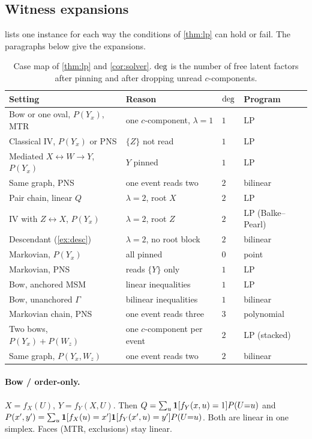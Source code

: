 \subsection{Witness expansions}
\label{app:witnesses}

 lists one instance for each way the conditions of
\cref{thm:lp} can hold or fail. The paragraphs below give the expansions.

\begin{table}[ht]
\centering
\caption{Case map of \cref{thm:lp} and \cref{cor:solver}. $\mathrm{deg}$ is the
number of free latent factors after pinning and after dropping unread
$c$-components.}
\label{tab:casemap}
\small
\begin{tabular}{@{}llll@{}}
\toprule
Setting & Reason & $\mathrm{deg}$ & Program \\
\midrule
Bow or one oval, $P(Y_x)$, MTR & one $c$-component, $\lambda=1$ & $1$ & LP \\
Classical IV, $P(Y_x)$ or PNS & $\{Z\}$ not read & $1$ & LP \\
Mediated $X\leftrightarrow W\to Y$, $P(Y_x)$ & $Y$ pinned & $1$ & LP \\
Same graph, PNS & one event reads two & $2$ & bilinear \\
Pair chain, linear $Q$ & $\lambda=2$, root $X$ & $2$ & LP \\
IV with $Z\leftrightarrow X$, $P(Y_x)$ & $\lambda=2$, root $Z$ & $2$ & LP (Balke--Pearl) \\
Descendant (\cref{ex:desc}) & $\lambda=2$, no root block & $2$ & bilinear \\
Markovian, $P(Y_x)$ & all pinned & $0$ & point \\
Markovian, PNS & reads $\{Y\}$ only & $1$ & LP \\
Bow, anchored MSM & linear inequalities & $1$ & LP \\
Bow, unanchored $\Gamma$ & bilinear inequalities & $1$ & bilinear \\
Markovian chain, PNS & one event reads three & $3$ & polynomial \\
Two bows, $P(Y_x)+P(W_z)$ & one $c$-component per event & $2$ & LP (stacked) \\
Same graph, $P(Y_x,W_z)$ & one event reads two & $2$ & bilinear \\
\bottomrule
\end{tabular}
\end{table}

\paragraph{Bow / order-only.}
$X=f_X(U)$, $Y=f_Y(X,U)$. Then
$Q=\sum_u\mathbf{1}[f_Y(x,u)=1]P(U{=}u)$ and
$P(x',y')=\sum_u\mathbf{1}[f_X(u)=x']\mathbf{1}[f_Y(x',u)=y']P(U{=}u)$.
Both are linear in one simplex. Faces (MTR, exclusions) stay linear.

